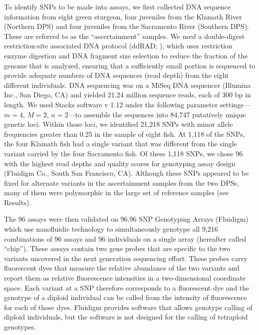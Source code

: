 To identify SNPs to be made into assays, we first collected DNA sequence
information from eight green sturgeon, four juveniles from the Klamath River 
(Northern DPS) and four juveniles from the Sacramento River (Southern DPS). 
These are referred to as the ``ascertainment'' samples. We used a double-digest restriction-site associated
DNA protocol (ddRAD; \citealt{Petersonetal2012}), which uses restriction
enzyme digestion and DNA fragment size selection to reduce the fraction of the
genome that is analyzed, ensuring that a sufficiently small portion is
sequenced to provide adequate numbers of DNA sequences (read depth) from the
eight different individuals. DNA sequencing was on a MiSeq DNA sequencer 
(Illumina Inc., San Diego, CA) and yielded 21.24 million sequence reads, 
each of 300 bp in length. We used Stacks software v 1.12 \citep{catchen2011stacks} 
under the following parameter settings---$m = 4$, $M = 2$, $n = 2$---to assemble 
the sequences into 84,747 putatively unique genetic loci. Within those loci, 
we identified 21,218 SNPs with minor allele frequencies greater than 0.25 
in the sample of eight fish. At 1,118 of the SNPs, the four Klamath fish 
had a single variant that was different from the single variant carried by 
the four Sacramento fish. Of these 1,118 SNPs, we chose 96 with the highest 
read depths and quality scores for \snptype{} genotyping assay design 
(Fluidigm Co., South San Francisco, CA). Although these SNPs appeared
to be fixed for alternate variants in the ascertainment samples from the 
two DPSs, many of them were polymorphic in the large set of reference samples (see Results).

The 96 assays were then validated on 96.96 SNP Genotyping Arrays (Fluidigm) 
which use nanofluidic technology to simultaneously genotype all 9,216 
combinations of 96 assays and 96 individuals on a single array (hereafter called “chip”). 
These assays contain two gene probes that are specific to the two variants 
uncovered in the next generation sequencing effort. These probes carry 
fluorescent dyes that measure the relative abundance of the two variants 
and report them as relative fluorescence intensities in a two-dimensional 
coordinate space. Each variant at a SNP therefore corresponds to a 
fluorescent dye and the genotype of a diploid individual can be called 
from the intensity of fluorescence for each of those dyes. 
Fluidigm provides software that allows genotype calling of diploid 
individuals, but the software is not designed for the calling of tetraploid genotypes. 


